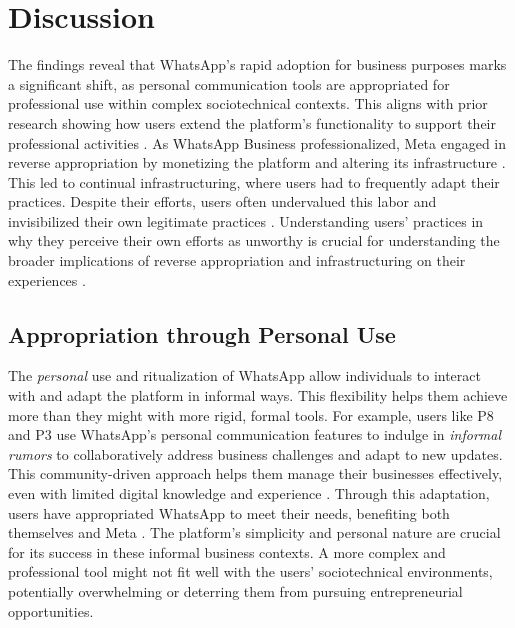 \section{Discussion}



The findings reveal that WhatsApp’s rapid adoption for business purposes marks a significant shift, as personal communication tools are appropriated for professional use within complex sociotechnical contexts. This aligns with prior research showing how users extend the platform’s functionality to support their professional activities \cite{rupvcic2020emergence, dominguez2020distributed, 10.1145/3025453.3025643}. As WhatsApp Business professionalized, Meta engaged in reverse appropriation by monetizing the platform and altering its infrastructure \cite{10.1145/3613905.3651034, owen2024monetization}. This led to continual infrastructuring, where users had to frequently adapt their practices. Despite their efforts, users often undervalued this labor and invisibilized their own legitimate practices \cite{crain2016invisible, doi:10.1177/1050651920979999}. Understanding users' practices in why they perceive their own efforts as unworthy is crucial for understanding the broader implications of reverse appropriation and infrastructuring on their experiences \cite{munro2012social, 10.1145/3555584, 10.1145/3415170}.


\subsection{Appropriation through Personal Use}

\label{appper}

The \textit{personal} use and ritualization of WhatsApp \cite{doi:10.1177/01968599221095177} allow individuals to interact with and adapt the platform in informal ways. This flexibility helps them achieve more than they might with more rigid, formal tools. For example, users like P8 and P3 use WhatsApp’s personal communication features to indulge in \textit{informal rumors} \cite{10.1145/3290605.3300563} to collaboratively address business challenges and adapt to new updates. This community-driven approach helps them manage their businesses effectively, even with limited digital knowledge and experience \cite{10.1145/3637429}. Through this adaptation, users have appropriated WhatsApp to meet their needs, benefiting both themselves and Meta \cite{10.1145/3313831.3376201}. The platform’s simplicity and personal nature are crucial for its success in these informal business contexts. A more complex and professional tool might not fit well with the users’ sociotechnical environments, potentially overwhelming or deterring them from pursuing entrepreneurial opportunities.

